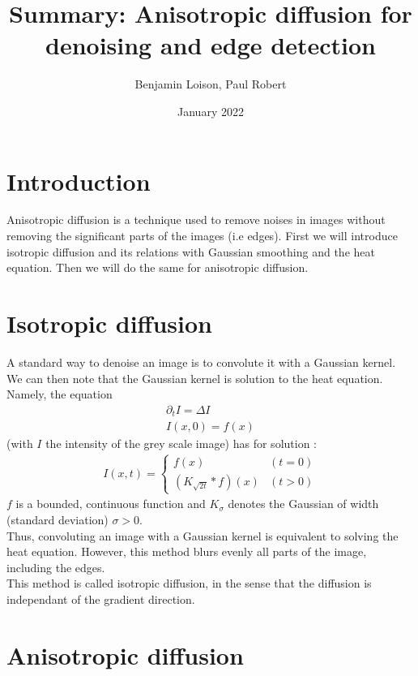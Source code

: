 \documentclass{article}
\title{Summary: Anisotropic diffusion for denoising and edge detection}
\author{Benjamin Loison, Paul Robert}
\date{January 2022}
\begin{document}
\maketitle

\setlength{\parindent}{0cm}

\section{Introduction}
Anisotropic diffusion is a technique used to remove noises in images without removing the significant parts of the images (i.e edges). First we will introduce isotropic diffusion and its relations with Gaussian smoothing and the heat equation. Then we will do the same for anisotropic diffusion.

\section{Isotropic diffusion}

A standard way to denoise an image is to convolute it with a Gaussian kernel. We can then note that the Gaussian kernel is solution to the heat equation. Namely, the equation 
\begin{equation}
\begin{align*}
    \partial_t I = \Delta I \\
    I(x,0)=f(x)
\end{align*}
\end{equation}
 (with $I$ the intensity of the grey scale image) has for solution : 
 \begin{equation}
 \begin{align*}
 I(x,t) = 
     \begin{cases}
     f(x) & (t=0) \\
     (K_{\sqrt{2t}} * f) (x) & (t>0)
     \end{cases}
 \end{align*}
 \end{equation}
$f$ is a bounded, continuous function and $K_\sigma$ denotes the Gaussian of width (standard deviation) $\sigma > 0$.\\ 
Thus, convoluting an image with a Gaussian kernel is equivalent to solving the heat equation. However, this method blurs evenly all parts of the image, including the edges.\\
This method is called isotropic diffusion, in the sense that the diffusion is independant of the gradient direction.
\section{Anisotropic diffusion}
\end{document}
